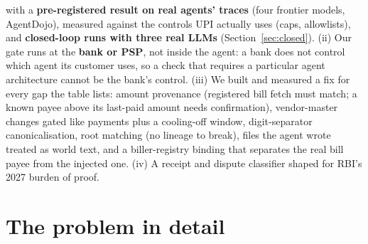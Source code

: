 \documentclass[10pt,a4paper]{article}
\begin{document}
with a \textbf{pre-registered result on real agents' traces} (four frontier models, AgentDojo), measured against the controls
UPI actually uses (caps, allowlists), and \textbf{closed-loop runs with three real LLMs} (Section~\ref{sec:closed}). (ii) Our gate runs at the
\textbf{bank or PSP}, not inside the agent: a bank does not control which agent its customer uses, so a check that requires
a particular agent architecture cannot be the bank's control. (iii) We built and measured a fix for every gap the table
lists: amount provenance (registered bill fetch must match; a known payee above its last-paid amount needs confirmation),
vendor-master changes gated like payments plus a cooling-off window, digit-separator canonicalisation, root matching (no
lineage to break), files the agent wrote treated as world text, and a biller-registry binding that separates the real bill
payee from the injected one. (iv) A receipt and dispute classifier shaped for RBI's 2027 burden of proof.



\section{The problem in detail}
\end{document}
